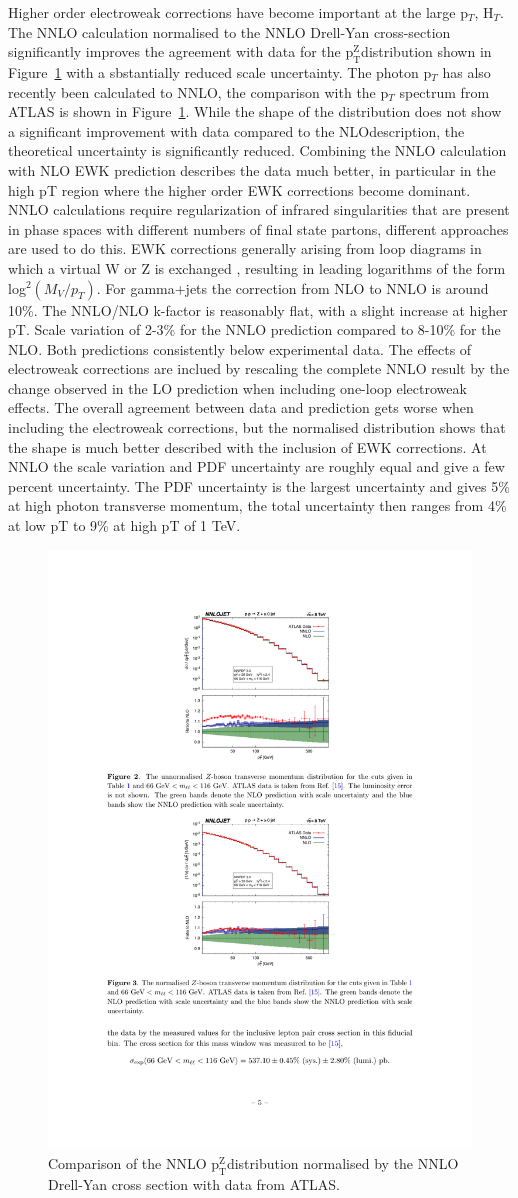 \documentclass[a4paper,11pt,notoc]{article}
\newcommand{\ptZ}{\ensuremath{\mathrm{p_T^{Z}}}}
\begin{document}
Higher order electroweak corrections have become important at the large p$_{T}$, H${_T}$. 
The NNLO calculation normalised to the NNLO Drell-Yan cross-section significantly improves the agreement with data for the \ptZ distribution shown in Figure~\ref{fig:ptNNLO} with a sbstantially reduced scale uncertainty. The photon p$_T$ has also recently been calculated to NNLO, the comparison with the p$_{T}$ spectrum from ATLAS is shown in Figure~\ref{fig:ptNNLO}. While the shape of the distribution does not show a significant improvement with data compared to the NLOdescription, the theoretical uncertainty is significantly reduced. Combining the NNLO calculation with NLO EWK prediction describes the data much better, in particular in the high pT region where the higher order EWK corrections become dominant. 
NNLO calculations require regularization of infrared singularities that are present in phase spaces with different numbers of final state partons, different approaches are used to do this. 
EWK corrections generally arising from loop diagrams in which a virtual W or Z is exchanged , resulting in leading logarithms of the form log$^2(M_V/p_T)$. For gamma+jets the correction from NLO to NNLO is around 10\%. The NNLO/NLO k-factor is reasonably flat, with a slight increase at higher pT. Scale variation of 2-3\% for the NNLO prediction compared to 8-10\% for the NLO. Both predictions consistently below experimental data. The effects of electroweak corrections are inclued by rescaling the complete NNLO result by the change observed in the LO prediction when including one-loop electroweak effects. The overall agreement between data and prediction gets worse when including the electroweak corrections, but the normalised distribution shows that the shape is much better described with the inclusion of EWK corrections. At NNLO the scale variation and PDF uncertainty are roughly equal and give a few percent uncertainty. The PDF uncertainty is the largest uncertainty and gives 5\% at high photon transverse momentum, the total uncertainty then ranges from 4\% at low pT to 9\% at high pT of 1 TeV. 
\begin{figure}[t!]
\centering
\includegraphics[width=0.495\columnwidth]{ptZNNLO.pdf} 
\caption{Comparison of the NNLO \ptZ distribution normalised by the NNLO Drell-Yan cross section with data from ATLAS.}
\label{fig:ptNNLO}
\end{figure}   
\end{document}
